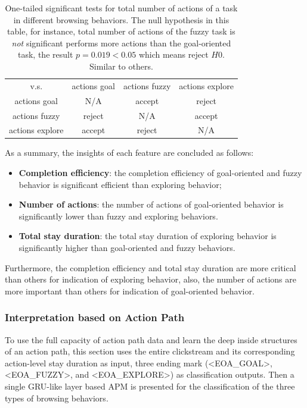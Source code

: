 \begin{table}[H]
    \small
    \centering
    \caption{One-tailed significant tests for total number of actions of a task in different browsing behaviors.
    The null hypothesis in this table, for instance, total number of actions of the fuzzy task
    is \emph{not} significant performs more actions than the goal-oriented task, the result $p=0.019<0.05$ which means
    reject $H0$. Similar to others.}
        \begin{tabular}{cccc}
            \toprule
              v.s.             & actions goal & actions fuzzy & actions explore \\
              actions goal      & N/A & accept & reject \\
              actions fuzzy     & reject & N/A & accept \\
              actions explore   & accept & reject & N/A \\
            \bottomrule
        \end{tabular}
        \label{table:sig-test-actions}
\end{table}

As a summary, the insights of each feature are concluded as follows:

\begin{itemize}
    \item \textbf{Completion efficiency}: the completion efficiency of goal-oriented and fuzzy behavior is significant efficient than exploring behavior;
    \item \textbf{Number of actions}: the number of actions of goal-oriented behavior is significantly lower than fuzzy and exploring behaviors.
    \item \textbf{Total stay duration}: the total stay duration of exploring behavior is significantly higher than goal-oriented and fuzzy behaviors.
\end{itemize}

Furthermore, the completion efficiency and total stay duration are more critical than others for indication of exploring behavior,
also, the number of actions are more important than others for indication of goal-oriented behavior.

\subsubsection{Interpretation based on Action Path}
\label{sec:inter-action-path}

To use the full capacity of action path data and learn the deep inside structures of an action path,
this section uses the entire clickstream and its corresponding
action-level stay duration as input, three ending mark (<EOA\_GOAL>, <EOA\_FUZZY>, and <EOA\_EXPLORE>) 
as classification outputs. Then a single GRU-like layer based APM is presented for
the classification of the three types of browsing behaviors.

